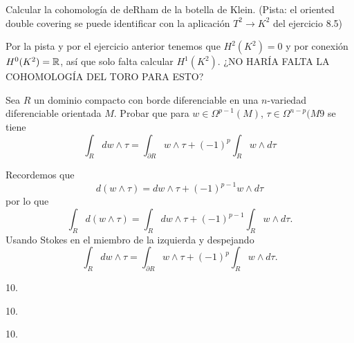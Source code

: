 \documentclass[twoside]{article}
\begin{document}
\begin{ejercicio}{10.5}
Calcular la cohomología de deRham de la botella de Klein. (Pista: el oriented double covering se puede identificar con la aplicación $T^2\to K^2$ del ejercicio 8.5)
\end{ejercicio}
\begin{solucion}
Por la pista y por el ejercicio anterior tenemos que $H^2(K^2)=0$ y por conexión $H^0(K^2)=\mathbb{R}$, así que solo falta calcular $H^1(K^2)$. 
¿NO HARÍA FALTA LA COHOMOLOGÍA DEL TORO PARA ESTO?
\end{solucion}
\newpage

\begin{ejercicio}{10.6}
Sea $R$ un dominio compacto con borde diferenciable en una $n$-variedad diferenciable orientada $M$. Probar que para $w\in\Omega^{p-1}(M)$, $\tau\in\Omega^{n-p}(M9$ se tiene
\[
\int_R dw\land \tau=\int_{\partial R}w\land\tau+(-1)^p\int_R w\land d\tau
\]
\end{ejercicio}
\begin{solucion}
Recordemos que 
\[
d(w\land\tau)=dw\land \tau +(-1)^{p-1} w\land d\tau
\]
por lo que
\[
\int_R d(w\land\tau)=\int_R dw\land \tau +(-1)^{p-1}\int_R w\land d\tau.
\]
Usando Stokes en el miembro de la izquierda y despejando
\[
\int_R dw\land \tau=\int_{\partial R}w\land\tau+(-1)^p\int_R w\land d\tau.
\]
\end{solucion}

\newpage

\begin{ejercicio}{10.}

\end{ejercicio}
\begin{solucion}

\end{solucion}
\newpage

\begin{ejercicio}{10.}

\end{ejercicio}
\begin{solucion}

\end{solucion}
\newpage

\begin{ejercicio}{10.}

\end{ejercicio}
\begin{solucion}


\end{solucion}
\newpage
\end{document}
